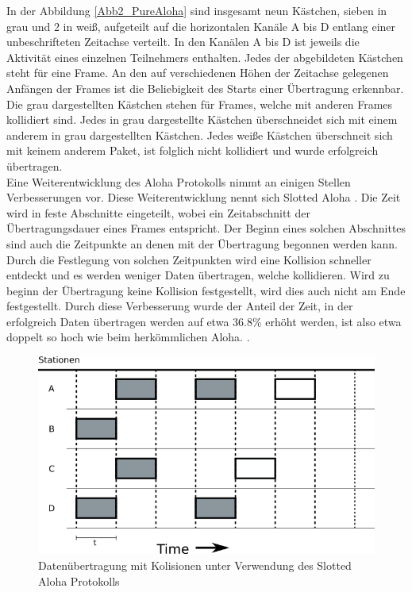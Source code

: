 In der Abbildung \ref{Abb2_PureAloha} sind insgesamt neun Kästchen, sieben in grau und 2 in weiß, aufgeteilt auf die horizontalen Kanäle A bis D entlang einer unbeschrifteten Zeitachse verteilt. In den Kanälen A bis D ist jeweils die Aktivität eines einzelnen Teilnehmers enthalten. Jedes der abgebildeten Kästchen steht für eine Frame. An den auf verschiedenen Höhen der Zeitachse gelegenen Anfängen der Frames ist die Beliebigkeit des Starts einer Übertragung erkennbar. Die grau dargestellten Kästchen stehen für Frames, welche mit anderen Frames kollidiert sind. Jedes in grau dargestellte Kästchen überschneidet sich mit einem anderem in grau dargestellten Kästchen. Jedes weiße Kästchen überschneit sich mit keinem anderem Paket, ist folglich nicht kollidiert und wurde erfolgreich übertragen.\\
Eine Weiterentwicklung des Aloha Protokolls nimmt an einigen Stellen Verbesserungen vor. Diese Weiterentwicklung nennt sich Slotted Aloha \cite{Back_AlohaPure}. Die Zeit wird in feste Abschnitte eingeteilt, wobei ein Zeitabschnitt der Übertragungsdauer eines Frames entspricht. Der Beginn eines solchen Abschnittes sind auch die Zeitpunkte an denen mit der Übertragung begonnen werden kann. Durch die Festlegung von solchen Zeitpunkten wird eine Kollision schneller entdeckt und es werden weniger Daten übertragen, welche kollidieren. Wird zu beginn der Übertragung keine Kollision festgestellt, wird dies auch nicht am Ende festgestellt. Durch diese Verbesserung wurde der Anteil der Zeit, in der erfolgreich Daten übertragen werden auf etwa 36.8\% erhöht werden, ist also etwa doppelt so hoch wie beim herkömmlichen Aloha. \cite{Back_AlohaPure}.\\
\begin{figure}[h!]
	\begin{center}
	\includegraphics[scale=0.6]{img/ZeichnungExportSlotted2.png}
	\caption{Datenübertragung mit Kolisionen unter Verwendung des Slotted Aloha Protokolls}
	\end{center}
	\label{Abb_SlottedAloha}
\end{figure}
